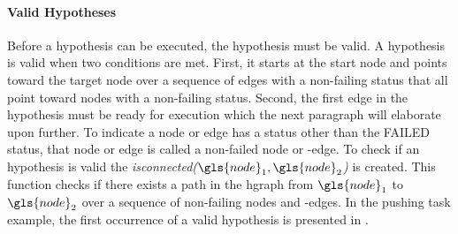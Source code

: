 
\paragraph{Valid Hypotheses}
Before a hypothesis can be executed, the hypothesis must be valid. A hypothesis is valid when two conditions are met. First, it starts at the start node and points toward the target node over a sequence of edges with a non-failing status that all point toward nodes with a non-failing status. Second, the first edge in the hypothesis must be ready for execution which the next paragraph will elaborate upon further. To indicate a node or edge has a status other than the FAILED status, that node or edge is called a non-failed node or -edge. To check if an hypothesis is valid the \textit{isconnected($\gls{node}_1, \gls{node}_2$)} is created. This function checks if there exists a path in the \ac{hgraph} from $\gls{node}_1$ to $\gls{node}_2$ over a sequence of non-failing nodes and -edges. In the pushing task example, the first occurrence of a valid hypothesis is presented in .\bs

